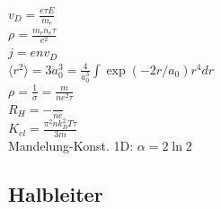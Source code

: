 \documentclass[12pt,a4paper]{article}
\renewcommand{\=}[1]{\stackrel{#1}{=}}
\theoremstyle{definition}
\theoremstyle{remark}
\begin{document}
\begin{center}
\begin{minipage}[t]{.35\linewidth}
\vspace{0pt}
\noindent\begin{tabular}{ll}
\toprule

\bottomrule
\end{tabular}
\end{minipage}%
\begin{minipage}[t]{.65\linewidth}
\vspace{0pt}
\begin{tabular}{ll}
\toprule


\end{tabular}
\end{minipage}
\end{center}


\hfill \break
\noindent $v_D = \frac{e \tau E}{m_e}$\\
$\rho = \frac{m_e n_e \tau}{e^2}$\\
$j = en v_D$\\
$\langle r^2 \rangle = 3 a_0^3 = \frac{4}{a_0^3} \int \exp (-2r/a_0) r^4 dr$\\
$\rho = \frac{1}{\sigma} = \frac{m}{ne^2 \tau}$\\
$R_H =- \frac{}{ne}$\\
$K_{el} = \frac{\pi^2 n k_B^2 T \tau}{3m}$\\
Mandelung-Konst. 1D: $\alpha = 2 \ln 2$

\subsection{Halbleiter}

\begin{center}
\begin{minipage}[t]{.35\linewidth}
\vspace{0pt}
\noindent\begin{tabular}{ll}
\toprule

\bottomrule
\end{tabular}
\end{minipage}%
\begin{minipage}[t]{.65\linewidth}
\vspace{0pt}
\begin{tabular}{ll}
\toprule


\end{tabular}
\end{minipage}
\end{center}
\end{document}
